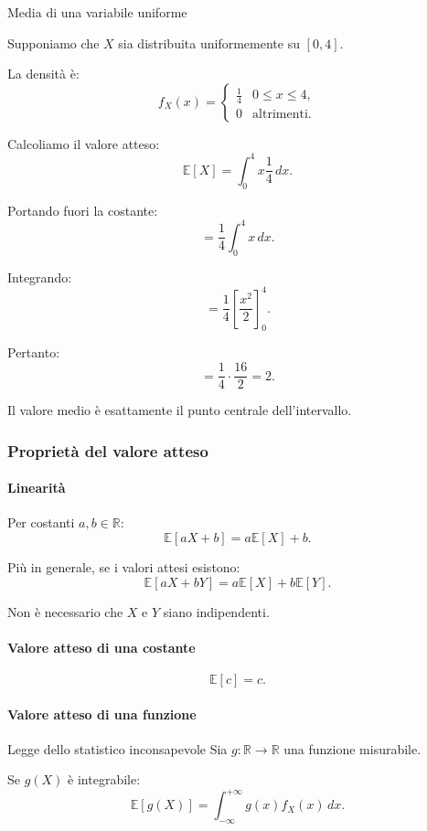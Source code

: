 \begin{example}{Media di una variabile uniforme}

Supponiamo che $X$ sia distribuita
uniformemente su $[0,4]$.

La densità è:
\[
f_X(x)=
\begin{cases}
\frac14 & 0\leq x\leq4,\\
0 & \text{altrimenti}.
\end{cases}
\]

Calcoliamo il valore atteso:
\[
\mathbb{E}[X]
=
\int_0^4 x\frac14\,dx.
\]

Portando fuori la costante:
\[
=
\frac14\int_0^4 x\,dx.
\]

Integrando:
\[
=
\frac14
\left[\frac{x^2}{2}\right]_0^4.
\]

Pertanto:
\[
=
\frac14\cdot\frac{16}{2}
=
\boxed{2}.
\]

Il valore medio è esattamente
il punto centrale dell'intervallo.
\end{example}

\subsubsection{Proprietà del valore atteso}

\paragraph{Linearità}

Per costanti $a,b\in\mathbb{R}$:
\[
\boxed{
\mathbb{E}[aX+b]
=
a\mathbb{E}[X]+b.
}
\]

Più in generale, se i valori attesi esistono:
\[
\boxed{
\mathbb{E}[aX+bY]
=
a\mathbb{E}[X]+b\mathbb{E}[Y].
}
\]

Non è necessario che $X$ e $Y$
siano indipendenti.

\paragraph{Valore atteso di una costante}

\[
\mathbb{E}[c]=c.
\]

\paragraph{Valore atteso di una funzione}

\begin{theorem}{Legge dello statistico inconsapevole}
Sia $g:\mathbb{R}\to\mathbb{R}$
una funzione misurabile.

Se $g(X)$ è integrabile:
\[
\boxed{
\mathbb{E}[g(X)]
=
\int_{-\infty}^{+\infty}
g(x)f_X(x)\,dx.
}
\]
\end{theorem}

